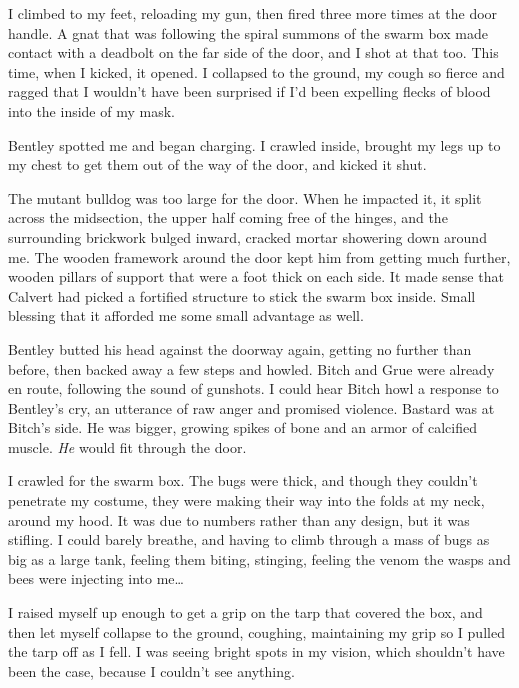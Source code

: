 I climbed to my feet, reloading my gun, then fired three more times at the door handle.  A gnat that was following the spiral summons of the swarm box made contact with a deadbolt on the far side of the door, and I shot at that too.  This time, when I kicked, it opened.  I collapsed to the ground, my cough so fierce and ragged that I wouldn't have been surprised if I'd been expelling flecks of blood into the inside of my mask.



Bentley spotted me and began charging.  I crawled inside, brought my legs up to my chest to get them out of the way of the door, and kicked it shut.



The mutant bulldog was too large for the door.  When he impacted it, it split across the midsection, the upper half coming free of the hinges, and the surrounding brickwork bulged inward, cracked mortar showering down around me.  The wooden framework around the door kept him from getting much further, wooden pillars of support that were a foot thick on each side.  It made sense that Calvert had picked a fortified structure to stick the  swarm box inside.  Small blessing that it afforded me some small advantage as well.



Bentley butted his head against the doorway again, getting no further than before, then backed away a few steps and howled.  Bitch and Grue were already en route, following the sound of gunshots.  I could hear Bitch howl a response to Bentley's cry, an utterance of raw anger and promised violence.  Bastard was at Bitch's side.  He was bigger, growing spikes of bone and an armor of calcified muscle.  \emph{He} would fit through the door.



I crawled for the swarm box.  The bugs were thick, and though they couldn't penetrate my costume, they were making their way into the folds at my neck, around my hood.  It was due to numbers rather than any design, but it was stifling.  I could barely breathe, and having to climb through a mass of bugs as big as a large tank, feeling them biting, stinging, feeling the venom the wasps and bees were injecting into me\ldots



I raised myself up enough to get a grip on the tarp that covered the box, and then let myself collapse to the ground, coughing, maintaining my grip so I pulled the tarp off as I fell.  I was seeing bright spots in my vision, which shouldn't have been the case, because I couldn't see anything.



